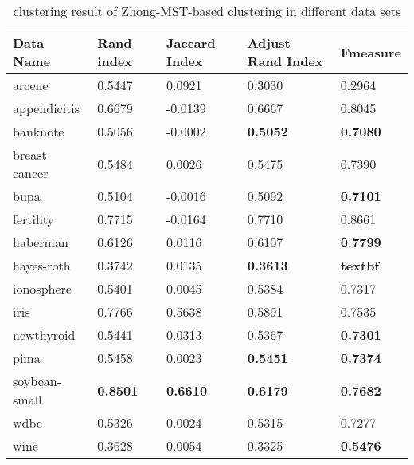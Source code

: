 		\begin{table}[htb]
	      \centering
	      \caption{clustering result of Zhong-MST-based clustering in different data sets}
	      \label{my-label}
	      \begin{tabular}{|lllll|}
	        \hline
	         Data Name & Rand index  & Jaccard Index  & Adjust Rand Index & F\-measure  \\ \hline
	         arcene         & 0.5447 & 0.0921 & 0.3030 & 0.2964  \\ 
	         appendicitis   & 0.6679 & -0.0139 & 0.6667 & 0.8045  \\ 
	         banknote       & 0.5056 & -0.0002 & \textbf{0.5052} & \textbf{0.7080}  \\ 
	         breast cancer  & 0.5484 & 0.0026 & 0.5475 & 0.7390 \\ 
	         bupa           & 0.5104 & -0.0016 & 0.5092 & \textbf{0.7101} \\ 
	         fertility      & 0.7715 & -0.0164 & 0.7710 & 0.8661 \\ 
	         haberman       & 0.6126 & 0.0116 & 0.6107 & \textbf{0.7799} \\ 
	         hayes-roth     & 0.3742 & 0.0135 & \textbf{0.3613} & \textbf{textbf{}}\ \\ 
	         ionosphere     & 0.5401 & 0.0045 & 0.5384 & 0.7317 \\ 
	         iris           & 0.7766 & 0.5638 & 0.5891 & 0.7535 \\ 
	         newthyroid     & 0.5441 & 0.0313 & 0.5367 & \textbf{0.7301} \\ 
	         pima           & 0.5458 & 0.0023 & \textbf{0.5451} & \textbf{0.7374} \\ 
	         soybean-small  & \textbf{0.8501} & \textbf{0.6610} & \textbf{0.6179} & \textbf{0.7682} \\ 
	         wdbc           & 0.5326 & 0.0024 & 0.5315 & 0.7277 \\ 
	         wine           & 0.3628 & 0.0054 & 0.3325 & \textbf{0.5476} \\ 
	         \hline
	      \end{tabular}
	    \end{table} 
		
